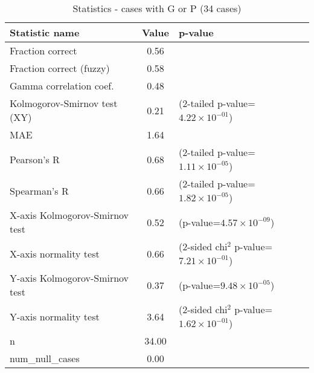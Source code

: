 \documentclass[10pt, letterpaper, oneside, titlepage, landscape]{scrreprt}
\begin{document}
\begin{table}[H]\begin{center}
\begin{tabular}{ l S[table-format=3.2] l}
Statistic name & {Value} & p-value\\
\hline
Fraction correct & 0.56 & \\
Fraction correct (fuzzy) & 0.58 & \\
Gamma correlation coef. & 0.48 & \\
Kolmogorov-Smirnov test (XY) & 0.21 & (2-tailed p-value=$4.22\times10^{-01}$)\\
MAE & 1.64 & \\
Pearson's R & 0.68 & (2-tailed p-value=$1.11\times10^{-05}$)\\
Spearman's R & 0.66 & (2-tailed p-value=$1.82\times10^{-05}$)\\
X-axis Kolmogorov-Smirnov test & 0.52 & (p-value=$4.57\times10^{-09}$)\\
X-axis normality test & 0.66 & (2-sided chi$^{2}$ p-value=$7.21\times10^{-01}$)\\
Y-axis Kolmogorov-Smirnov test & 0.37 & (p-value=$9.48\times10^{-05}$)\\
Y-axis normality test & 3.64 & (2-sided chi$^{2}$ p-value=$1.62\times10^{-01}$)\\
n & 34.00 & \\
num\_null\_cases & 0.00 & \\
\end{tabular}
\caption{Statistics - cases with G or P (34 cases)}
\end{center}\end{table}
\end{document}
